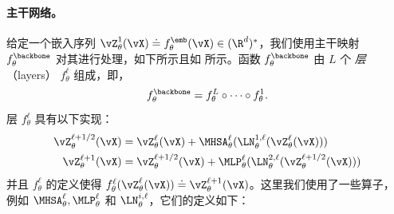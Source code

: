 \documentclass[../../book-main_zh.tex]{subfiles}
\begin{document}
\paragraph{主干网络。} 给定一个嵌入序列
\(\vZ_{\theta}^{1}(\vX) \doteq f_{\theta}^{\emb}(\vX) \in
(\R^{d})^{*}\)，我们使用主干映射
\(f_{\theta}^{\backbone}\) 对其进行处理，如下所示且如
 所示。函数
\(f_{\theta}^{\backbone}\) 由 \(L\) 个 \textit{层}（layers）
\(f_{\theta}^{\ell}\) 组成，即，
\begin{equation}
    f_{\theta}^{\backbone} = f_{\theta}^{L} \circ \cdots \circ f_{\theta}^{1}.
\end{equation}
层 \(f_{\theta}^{\ell}\) 具有以下实现：
\begin{align}\label{eq:vit-res-block}
    \vZ_{\theta}^{\ell + 1/2}(\vX)
    &= \vZ_{\theta}^{\ell}(\vX) +
    \MHSA_{\theta}^{\ell}(\LN_{\theta}^{1, \ell}(\vZ_{\theta}^{\ell}(\vX))) \\
    \vZ_{\theta}^{\ell + 1}(\vX)
    &= \vZ_{\theta}^{\ell + 1/2}(\vX) +
    \MLP_{\theta}^{\ell}(\LN_{\theta}^{2, \ell}(\vZ_{\theta}^{\ell + 1/2}(\vX)))
\end{align}
并且 \(f_{\theta}^{\ell}\) 的定义使得
\(f_{\theta}^{\ell}(\vZ_{\theta}^{\ell}(\vX)) \doteq
\vZ_{\theta}^{\ell + 1}(\vX)\)。这里我们使用了一些算子，
例如 \(\MHSA_{\theta}^{\ell}, \MLP_{\theta}^{\ell}\) 和
\(\LN_{\theta}^{i, \ell}\)，它们的定义如下：
\end{document}
